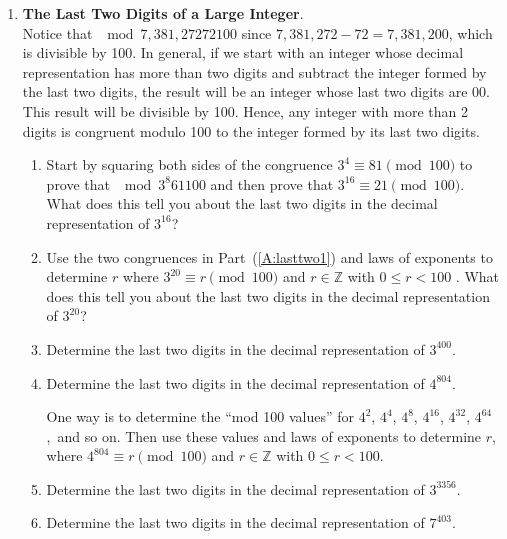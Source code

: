 \begin{enumerate}
\item \textbf{The Last Two Digits of a Large Integer}.  \\
Notice that $\mod{7,381,272}{72}{100}$ since 
$7,381,272 - 72 = 7,381,200$, which is divisible by 100.  In general, if we start with an integer whose decimal representation has more than two digits and subtract the integer formed by the last two digits, the result will be an integer whose last two digits are 00.  This result will be divisible by 100.  Hence, any integer with more than 2 digits is congruent modulo 100 to the integer formed by its last two digits.
\begin{enumerate}
\item Start by squaring both sides of the congruence  $3^4  \equiv 81 \pmod {100}$ to prove that $\mod{3^8}{61}{100}$ and then prove that  
$3^{16}  \equiv 21 \pmod {100}$.  What does this tell you about the last two digits in the decimal representation of  $3^{16} $?
\label{A:lasttwo1}%

\item Use the two congruences in Part~(\ref{A:lasttwo1}) and laws of exponents to determine  $r$  where  $3^{20}  \equiv r \pmod {100}$ and  $r \in \mathbb{Z}$ with  $0 \leq r < 100$
. What does this tell you about the last two digits in the decimal representation of  $3^{20} $?


\item Determine the last two digits in the decimal representation of  $3^{400} $.



\item Determine the last two digits in the decimal representation of  $4^{804} $.

\hint  One way is to determine the  ``mod 100 values''  for  $4^2$, $4^4$, $4^8$, $4^{16}$, $4^{32}$, $4^{64}$,~and so on.  Then use these values and laws of exponents to determine 
$r$,  where  $4^{804}  \equiv r \pmod {100}$ and  $r \in \mathbb{Z}$ with  $0 \leq r < 100$.
\item Determine the last two digits in the decimal representation of  $3^{3356} $.
\item Determine the last two digits in the decimal representation of  $7^{403} $.
\end{enumerate}

\end{enumerate}


\hbreak

\endinput
